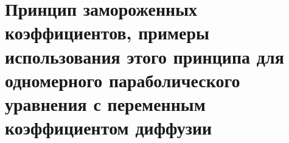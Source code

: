 \documentclass[__main__.tex]{subfiles}
\begin{document}
\section{Принцип замороженных коэффициентов, примеры использования этого принципа для одномерного параболического уравнения с переменным коэффициентом диффузии}
\end{document}
